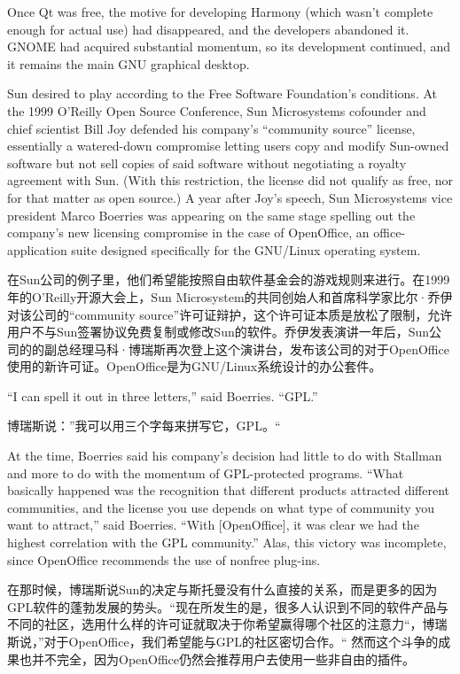 Once Qt was free, the motive for developing Harmony (which wasn't complete enough for actual use) had disappeared, and the developers abandoned it. GNOME had acquired substantial momentum, so its development continued, and it remains the main GNU graphical desktop.

\ifdefined\eng
Sun desired to play according to the Free Software Foundation's conditions. At the 1999 O'Reilly Open Source Conference, Sun Microsystems cofounder and chief scientist Bill Joy defended his company's ``community source'' license, essentially a watered-down compromise letting users copy and modify Sun-owned software but not sell copies of said software without negotiating a royalty agreement with Sun. (With this restriction, the license did not qualify as free, nor for that matter as open source.) A year after Joy's speech, Sun Microsystems vice president Marco Boerries was appearing on the same stage spelling out the company's new licensing compromise in the case of OpenOffice, an office-application suite designed specifically for the GNU/Linux operating system.
\fi

\ifdefined\chs
在Sun公司的例子里，他们希望能按照自由软件基金会的游戏规则来进行。在1999年的O'Reilly开源大会上，Sun Microsystem的共同创始人和首席科学家比尔·乔伊对该公司的“community source”许可证辩护，这个许可证本质是放松了限制，允许用户不与Sun签署协议免费复制或修改Sun的软件。乔伊发表演讲一年后，Sun公司的的副总经理马科·博瑞斯再次登上这个演讲台，发布该公司的对于OpenOffice使用的新许可证。OpenOffice是为GNU/Linux系统设计的办公套件。
\fi

\ifdefined\eng
``I can spell it out in three letters,'' said Boerries. ``GPL.''
\fi

\ifdefined\chs
博瑞斯说：”我可以用三个字每来拼写它，GPL。“
\fi

\ifdefined\eng
At the time, Boerries said his company's decision had little to do with Stallman and more to do with the momentum of GPL-protected programs. ``What basically happened was the recognition that different products attracted different communities, and the license you use depends on what type of community you want to attract,'' said Boerries. ``With [OpenOffice], it was clear we had the highest correlation with the GPL community.''  Alas, this victory was incomplete, since OpenOffice recommends the use of nonfree plug-ins.
\fi

\ifdefined\chs
在那时候，博瑞斯说Sun的决定与斯托曼没有什么直接的关系，而是更多的因为GPL软件的蓬勃发展的势头。“现在所发生的是，很多人认识到不同的软件产品与不同的社区，选用什么样的许可证就取决于你希望赢得哪个社区的注意力“，博瑞斯说，”对于OpenOffice，我们希望能与GPL的社区密切合作。“ 然而这个斗争的成果也并不完全，因为OpenOffice仍然会推荐用户去使用一些非自由的插件。
\fi

